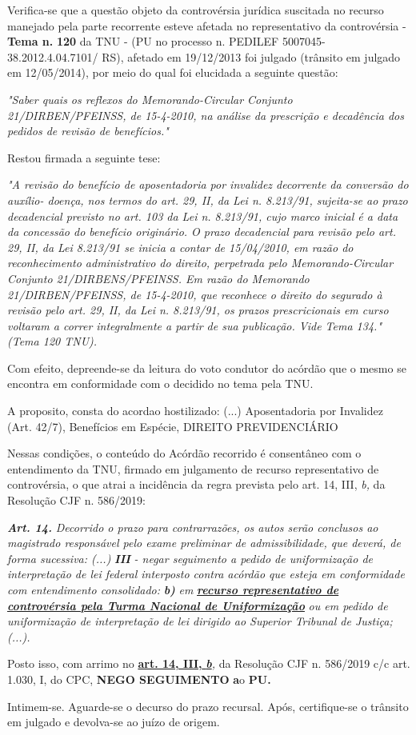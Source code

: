 \documentclass[12pt]{article}
\begin{document}
\justifying
\noindent Verifica-se que a questão objeto da controvérsia jurídica suscitada no recurso manejado pela parte recorrente esteve afetada no representativo da controvérsia - \textbf{Tema n. }\textbf{120} da TNU - (PU no processo n. PEDILEF 5007045-38.2012.4.04.7101/ RS),  afetado em 19/12/2013 foi julgado (trânsito em julgado em 12/05/2014), por meio do qual foi elucidada a seguinte questão:

\noindent \textit{"Saber quais os reflexos do Memorando-Circular Conjunto 21/DIRBEN/PFEINSS, de 15-4-2010, na análise da prescrição e decadência dos pedidos de revisão de benefícios."}

\noindent Restou firmada a seguinte tese:

\noindent \textit{"A revisão do benefício de aposentadoria por invalidez decorrente da conversão do auxílio- doença, nos termos do art. 29, II, da Lei n. 8.213/91, sujeita-se ao prazo decadencial previsto no art. 103 da Lei n. 8.213/91, cujo marco inicial é a data da concessão do benefício originário. O prazo decadencial para revisão pelo art. 29, II, da Lei 8.213/91 se inicia a contar de 15/04/2010, em razão do reconhecimento administrativo do direito, perpetrada pelo Memorando-Circular Conjunto 21/DIRBENS/PFEINSS. Em razão do Memorando 21/DIRBEN/PFEINSS, de 15-4-2010, que reconhece o direito do segurado à revisão pelo art. 29, II, da Lei n. 8.213/91, os prazos prescricionais em curso voltaram a correr integralmente a partir de sua publicação. Vide Tema 134." (Tema 120 TNU).}

\noindent Com efeito, depreende-se da leitura do voto condutor do acórdão que o mesmo se encontra em conformidade com o decidido no  tema pela TNU.

\noindent A proposito, consta do acordao hostilizado: (...) Aposentadoria por Invalidez (Art. 42/7), Benefícios em Espécie, DIREITO PREVIDENCIÁRIO

\noindent Nessas condições, o conteúdo do Acórdão recorrido é consentâneo com o entendimento da TNU, firmado em julgamento de recurso representativo de controvérsia, o que atrai a incidência da regra prevista pelo art. 14, III, \textit{b,} da Resolução CJF n. 586/2019:

\noindent \textit{\textbf{Art. 14.}}\textit{ Decorrido o prazo para contrarrazões, os autos serão conclusos ao magistrado responsável pelo exame preliminar de admissibilidade, que deverá, de forma sucessiva: (...) }\textit{\textbf{III }}\textit{- negar seguimento a pedido de uniformização de interpretação de lei federal interposto contra acórdão que esteja em conformidade com entendimento consolidado: }\textit{\textbf{b)}}\textit{ em }\uline{\textit{\textbf{recurso representativo de controvérsia pela Turma Nacional de Uniformização}}}\textit{ ou em pedido de uniformização de interpretação de lei dirigido ao Superior Tribunal de Justiça;(...).}

\noindent Posto isso, com arrimo no \uline{\textbf{art. 14, III, }}\uline{\textit{\textbf{b}}}\textit{,} da Resolução CJF n. 586/2019 c/c art. 1.030, I, do CPC, \textbf{NEGO SEGUIMENTO }\textbf{a}o\textbf{ PU}\textbf{.}

\noindent Intimem-se. Aguarde-se o decurso do prazo recursal. Após, certifique-se o trânsito em julgado e devolva-se ao juízo de origem.
\end{document}
